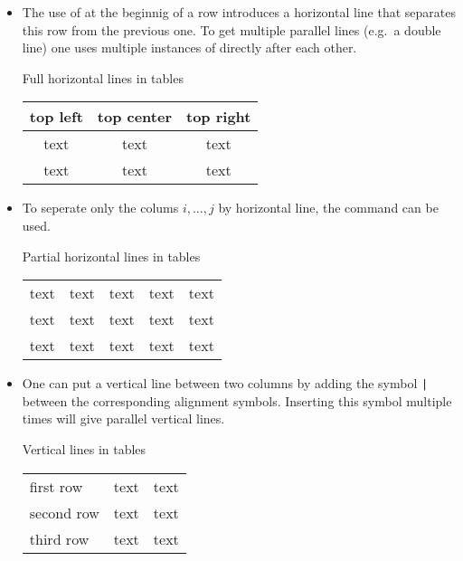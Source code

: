 \begin{itemize}
  \item
    The use of  at the beginnig of a row introduces a horizontal line that separates this row from the previous one.
    To get multiple parallel lines (e.g.\ a double line) one uses multiple instances of  directly after each other.
    \begin{showlatex}{Full horizontal lines in tables}
\begin{center}
\begin{tabular}{ccc}
  top left & top center & top right \\
  \hline\hline
  text     & text       & text      \\
  \hline
  text     & text       & text
\end{tabular}
\end{center}
  \end{showlatex}
  \item
    To seperate only the colums $i, \dotsc, j$ by horizontal line, the command  can be used.
    \begin{showlatex}{Partial horizontal lines in tables}
\begin{center}
\begin{tabular}{ccccc}
  text & text & text & text & text \\
  \cline{2-4}
  text & text & text & text & text \\
  \cline{1-2} \cline{4-5}
  text & text & text & text & text
\end{tabular}
\end{center}
    \end{showlatex}
  \item
     One can put a vertical line between two columns by adding the symbol \texttt{|} between the corresponding alignment symbols.
     Inserting this symbol multiple times will give parallel vertical lines.
     \begin{showlatex}{Vertical lines in tables}
\begin{tabular}{l||c|c}
  first row   & text & text \\
  second row  & text & text \\
  third row   & text & text
\end{tabular}
     \end{showlatex}
\end{itemize}

